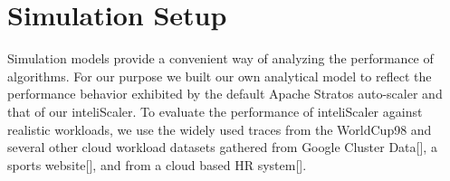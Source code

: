 \section{Simulation Setup}
Simulation models provide a convenient way of analyzing the performance of algorithms. For our purpose we built our own analytical model to reflect the performance behavior exhibited by the default Apache Stratos auto-scaler and that of our inteliScaler. To evaluate the performance of inteliScaler against realistic workloads, we use the widely used traces from the WorldCup98\cite{website:worldcup} and several other cloud workload datasets gathered from Google Cluster Data[], a sports website[], and from a cloud based HR system[]. \\